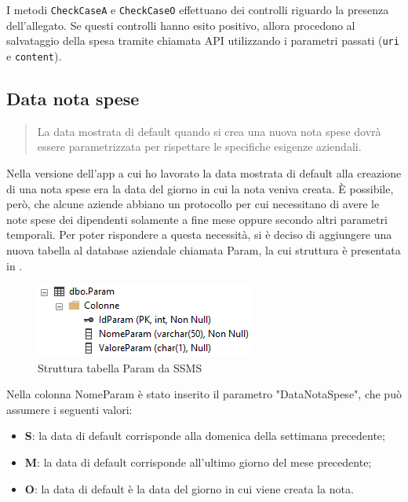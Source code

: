 \noindent I metodi \verb|CheckCaseA| e \verb|CheckCaseO| effettuano dei controlli riguardo la presenza dell'allegato. Se questi controlli hanno esito positivo, allora procedono al salvataggio della spesa tramite chiamata API utilizzando i parametri passati (\verb|uri| e \verb|content|).

\subsection{Data nota spese}

\begin{quote}
    La data mostrata di default quando si crea una nuova nota spese dovrà essere parametrizzata per rispettare le specifiche esigenze aziendali.
\end{quote}

\noindent Nella versione dell'app a cui ho lavorato la data mostrata di default alla creazione di una nota spese era la data del giorno in cui la nota veniva creata. È possibile, però, che alcune aziende abbiano un protocollo per cui necessitano di avere le note spese dei dipendenti solamente a fine mese oppure secondo altri parametri temporali. Per poter rispondere a questa necessità, si è deciso di aggiungere una nuova tabella al database aziendale chiamata Param, la cui struttura è presentata in .

\begin{figure}[H]
    \centering
    \includegraphics[width=.5\columnwidth]{images/paramTable.png}
    \caption{Struttura tabella Param da SSMS}
    \label{fig:paramtable}
\end{figure}

\noindent Nella colonna NomeParam è stato inserito il parametro "DataNotaSpese", che può assumere i seguenti valori:
\begin{itemize}
    \item \textbf{S}: la data di default corrisponde alla domenica della settimana precedente;
    \item \textbf{M}: la data di default corrisponde all'ultimo giorno del mese precedente;
    \item \textbf{O}: la data di default è la data del giorno in cui viene creata la nota.
\end{itemize}

